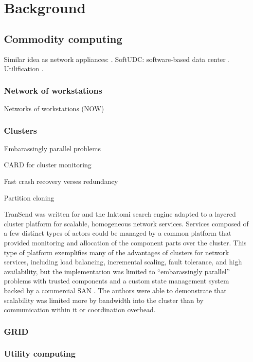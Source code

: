 \chapter{Background}

\section{Commodity computing}


Similar idea as network appliances: \cite{sapuntzakis03}. SoftUDC: software-based data center \cite{kallahalla}. Utilification \cite{wilkes04}.

\subsection{Network of workstations}
Networks of workstations (NOW)\cite{anderson95a}

\subsection{Clusters}

Embarassingly parallel problems

CARD for cluster monitoring\cite{anderson97}

Fast crash recovery verses redundancy\cite{baker94}

Partition cloning \cite{rauch}

TranSend was written for and the Inktomi search engine adapted to a layered cluster platform for scalable, homogeneous network services. Services composed of a few distinct types of actors could be managed by a common platform that provided monitoring and allocation of the component parts over the cluster. This type of platform exemplifies many of the advantages of clusters for network services, including load balancing, incremental scaling, fault tolerance, and high availability, but the implementation was limited to ``embarassingly parallel'' problems with trusted components and a custom state management system backed by a commercial SAN \cite{fox}. The authors were able to demonstrate that scalability was limited more by bandwidth into the cluster than by communication within it or coordination overhead.

\subsection{GRID}
\cite{zhao04}

\subsection{Utility computing}
